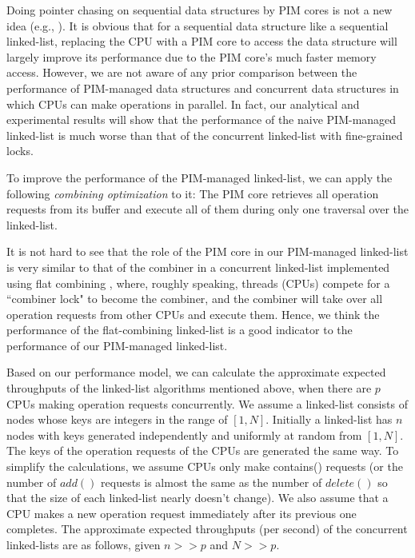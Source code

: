 \documentclass[11pt]{article}
\begin{document}
Doing pointer chasing on sequential data structures by PIM cores is not a new idea
(e.g., \cite{hsieh2016accelerating, Ahn2015:2}).
It is obvious that for a sequential data structure like a sequential linked-list,
replacing the CPU with a PIM core to access the data structure will largely improve
its performance due to the PIM core's much faster memory access.
However, we are not aware of any prior comparison between the performance of
PIM-managed data structures and concurrent data structures
in which CPUs can make operations in parallel.
In fact, our analytical and experimental results will show that
the performance of the naive PIM-managed linked-list is much worse than
that of the concurrent linked-list with fine-grained locks\cite{Heller05}.

To improve the performance of the PIM-managed linked-list,
we can apply the following \emph{combining optimization} to it:
The PIM core retrieves all operation requests from its buffer and
execute all of them during only one traversal over the linked-list.

It is not hard to see that the role of the PIM core in our PIM-managed linked-list
is very similar to that of the combiner in a concurrent linked-list implemented
using flat combining \cite{Hendler10}, where, roughly speaking,
threads (CPUs) compete for a ``combiner lock" to become the combiner, and
the combiner will take over all operation requests from other CPUs and execute them.
Hence, we think the performance of the flat-combining linked-list is a good indicator to
the performance of our PIM-managed linked-list.

Based on our performance model, we can calculate the approximate expected
throughputs of the linked-list algorithms mentioned above, 
when there are $p$ CPUs making operation requests concurrently.
We assume a linked-list consists of nodes whose keys are integers in the range of $[1, N]$.
Initially a linked-list has $n$ nodes with keys generated independently
and uniformly at random from $[1, N]$.
The keys of the operation requests of the CPUs are generated the same way.
To simplify the calculations, we assume CPUs only make contains() requests
(or the number of $add()$ requests is almost the same as the number of $delete()$
so that the size of each linked-list nearly doesn't change).
We also assume that a CPU makes a new operation request immediately after
its previous one completes.
The approximate expected throughputs (per second) of the concurrent linked-lists
are as follows, given $n >> p$ and $N >> p$.
\end{document}
